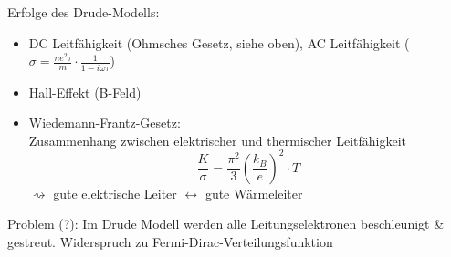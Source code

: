 \begin{itemize}
    Erfolge des Drude-Modells:
    \begin{itemize}
        \item DC Leitfähigkeit (Ohmsches Gesetz, siehe oben), AC Leitfähigkeit ($\sigma = \frac{n e^2 \tau}{m} \cdot \frac{1}{1-i\omega \tau}$)
        \item Hall-Effekt (B-Feld)
        \item Wiedemann-Frantz-Gesetz:\\
        Zusammenhang zwischen elektrischer und thermischer Leitfähigkeit $$\frac{K}{\sigma} = \frac{\pi^2}{3} \left(\frac{k_B}{e}\right)^2 \cdot T$$
        $\rightsquigarrow$ gute elektrische Leiter $\leftrightarrow$ gute Wärmeleiter
    \end{itemize}
    Problem (?): Im Drude Modell werden alle Leitungselektronen beschleunigt \& gestreut. Widerspruch zu Fermi-Dirac-Verteilungsfunktion


\end{itemize}
